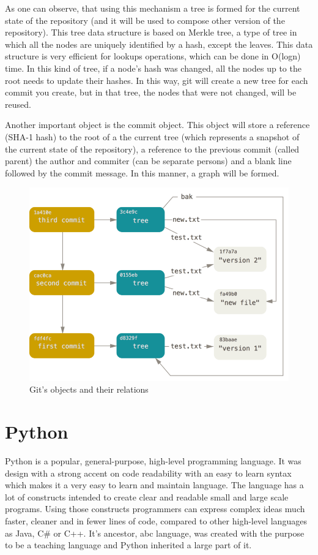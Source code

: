        As one can observe, that using this mechanism a tree is formed for the current state of the repository (and it will be used to compose other version of the repository). This tree data structure is based on Merkle tree, a type of tree in which all the nodes are uniquely identified by a hash, except the leaves. This data structure is very efficient for lookups operations, which can be done in O(logn) time. In this kind of tree, if a node's hash was changed, all the nodes up to the root needs to update their hashes. In this way, git will create a new tree for each commit you create, but in that tree, the nodes that were not changed, will be reused.
        
        Another important object is the commit object. This object will store a reference (SHA-1 hash) to the root of a the current tree (which represents a snapshot of the current state of the repository), a reference to the previous commit (called parent) the author and commiter (can be separate persons) and a blank line followed by the commit message. In this manner, a graph will be formed.
        
         \begin{figure}[h]
           \begin{center}
               \includegraphics[width=15cm]{theoretical/data-model-3.png}
            \end{center}
            \label{fig:git-objects}\caption{Git's objects and their relations}
        \end{figure}
    
\section{Python}
    Python is a popular, general-purpose, high-level programming language. It was design with a strong accent on code readability with an easy to learn syntax which makes it a very easy to learn and maintain language. The language has a lot of constructs intended to create clear and readable small and large scale programs. Using those constructs programmers can express complex ideas much faster, cleaner and in fewer lines of code, compared to other high-level languages as Java, C# or C++. It's ancestor, abc language, was created with the purpose to be a teaching language and Python inherited a large part of it.
    
